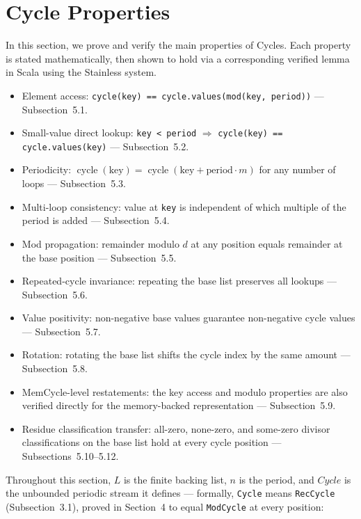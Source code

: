 \section{Cycle Properties}

In this section, we prove and verify the main properties of Cycles. Each
property is stated mathematically, then shown to hold via a corresponding
verified lemma in Scala using the Stainless system.

\begin{itemize}
  \item Element access: \texttt{cycle(key) == cycle.values(mod(key, period))}
    --- Subsection~5.1.
  \item Small-value direct lookup: \texttt{key < period} $\Rightarrow$
    \texttt{cycle(key) == cycle.values(key)} --- Subsection~5.2.
  \item Periodicity:
    $\operatorname{cycle}(\text{key})=
    \operatorname{cycle}(\text{key}+\text{period}\cdot m)$ for any number of
    loops --- Subsection~5.3.
  \item Multi-loop consistency: value at \texttt{key} is independent of which
    multiple of the period is added --- Subsection~5.4.
  \item Mod propagation: remainder modulo $d$ at any position equals remainder
    at the base position --- Subsection~5.5.
  \item Repeated-cycle invariance: repeating the base list preserves all
    lookups --- Subsection~5.6.
  \item Value positivity: non-negative base values guarantee non-negative cycle
    values --- Subsection~5.7.
  \item Rotation: rotating the base list shifts the cycle index by the same
    amount --- Subsection~5.8.
  \item MemCycle-level restatements: the key access and modulo properties are
    also verified directly for the memory-backed representation ---
    Subsection~5.9.
  \item Residue classification transfer: all-zero, none-zero, and some-zero
    divisor classifications on the base list hold at every cycle position ---
    Subsections~5.10--5.12.
\end{itemize}

Throughout this section, $L$ is the finite backing list, $n$ is the period,
and $Cycle$ is the unbounded periodic stream it defines --- formally,
\texttt{Cycle} means \texttt{RecCycle} (Subsection~3.1), proved in Section~4 to
equal \texttt{ModCycle} at every position:

